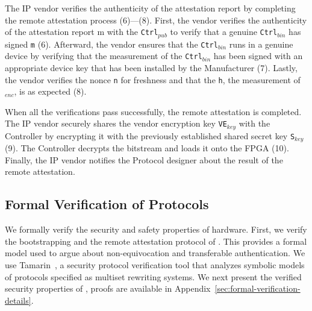 The IP vendor verifies the authenticity of the attestation report by completing the remote attestation process (6)---(8). First, the vendor verifies the authenticity of the attestation report m with the \texttt{Ctrl$_{pub}$} to verify that a genuine \texttt{Ctrl$_{bin}$} has signed \texttt{m} (6). Afterward, the vendor ensures that the \texttt{Ctrl$_{bin}$} runs in a genuine \projecttitle{} device by verifying that the measurement of the \texttt{Ctrl$_{bin}$} has been signed with an appropriate device key that has been installed by the Manufacturer (7). Lastly, the vendor verifies the nonce \texttt{n} for freshness and that the \texttt{h}, the measurement of \projecttitle{}$_{enc}$, is as expected (8). 

When all the verifications pass successfully, the remote attestation is completed. The IP vendor securely shares the vendor encryption key \texttt{VE$_{key}$} with the Controller by encrypting it with the previously established shared secret key \texttt{S$_{key}$} (9). The Controller decrypts the \projecttitle{} bitstream and loads it onto the FPGA (10). 
Finally, the IP vendor notifies the Protocol designer about the result of the remote attestation.


\subsection{Formal Verification of \projecttitle{} Protocols}
\label{subsec::formal_verification_remote_attestation}


We formally verify the security and safety properties of \projecttitle{} hardware. First, we verify the bootstrapping and the remote attestation protocol of \projecttitle{}. This provides a formal model used to argue about non-equivocation and transferable authentication. We use Tamarin~\cite{tamarin-prover}, a security protocol verification tool that analyzes symbolic models of protocols specified as multiset rewriting systems. We next present the verified security properties of \projecttitle{}, proofs are available in Appendix~\ref{sec:formal-verification-details}. 

